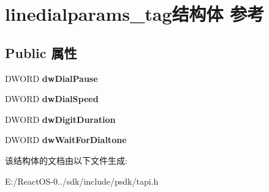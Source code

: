 \hypertarget{structlinedialparams__tag}{}\section{linedialparams\+\_\+tag结构体 参考}
\label{structlinedialparams__tag}
\subsection*{Public 属性}
\begin{DoxyCompactItemize}
\item 
\mbox{\label{structlinedialparams__tag_afc63e17f9a8e38f70be476280108f17c}} 
D\+W\+O\+RD {\bfseries dw\+Dial\+Pause}
\item 
\mbox{\label{structlinedialparams__tag_aa0e422e166083a314614fe035cf6eeff}} 
D\+W\+O\+RD {\bfseries dw\+Dial\+Speed}
\item 
\mbox{\label{structlinedialparams__tag_a1de75c1199ee3392589f1bb722d2aab9}} 
D\+W\+O\+RD {\bfseries dw\+Digit\+Duration}
\item 
\mbox{\label{structlinedialparams__tag_a49b018ce2692141cc2d3e4b664300601}} 
D\+W\+O\+RD {\bfseries dw\+Wait\+For\+Dialtone}
\end{DoxyCompactItemize}


该结构体的文档由以下文件生成\+:\begin{DoxyCompactItemize}
\item 
E\+:/\+React\+O\+S-\/0../sdk/include/psdk/tapi.\+h\end{DoxyCompactItemize}

